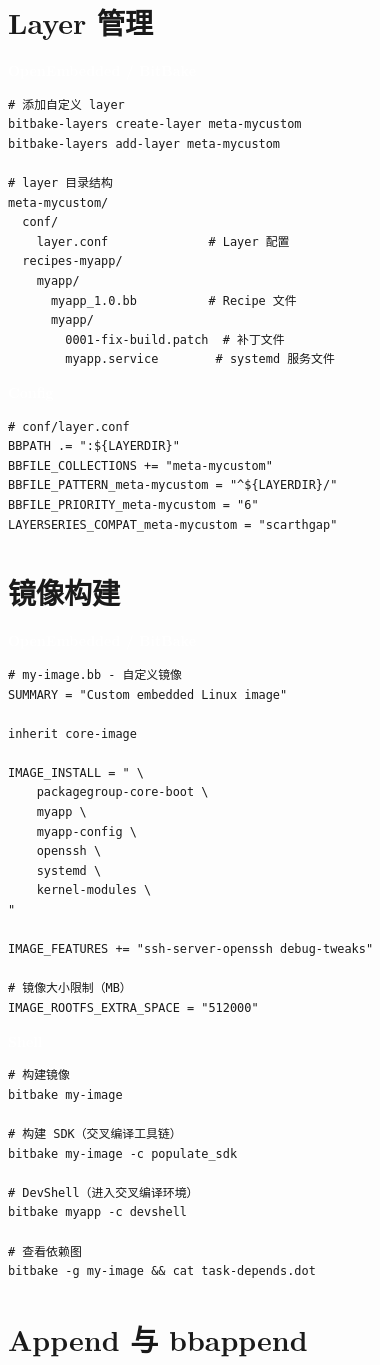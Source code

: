 \documentclass[12pt,a4paper,fontset=fandol]{ctexbook}
\newcommand{\bashlabel}{%
  \noindent\begin{tcolorbox}[sharp corners,colback=cfgheadbg,colframe=cfgheadbg,
    left=6pt,right=6pt,top=2pt,bottom=2pt,boxrule=0pt]
  \textcolor{white}{\small\bfseries\sffamily Shell}\end{tcolorbox}%
}
\newcommand{\oelabel}{%
  \noindent\begin{tcolorbox}[sharp corners,colback=oeheadbg,colframe=oeheadbg,
    left=6pt,right=6pt,top=2pt,bottom=2pt,boxrule=0pt]
  \textcolor{white}{\small\bfseries\sffamily OpenEmbedded / BitBake}\end{tcolorbox}%
}
\newcommand{\cfglabel}{%
  \noindent\begin{tcolorbox}[sharp corners,colback=cfgheadbg,colframe=cfgheadbg,
    left=6pt,right=6pt,top=2pt,bottom=2pt,boxrule=0pt]
  \textcolor{white}{\small\bfseries\sffamily Config}\end{tcolorbox}%
}
\begin{document}
\section{Layer 管理}

\oelabel
\begin{lstlisting}[style=bashstyle]
# 添加自定义 layer
bitbake-layers create-layer meta-mycustom
bitbake-layers add-layer meta-mycustom

# layer 目录结构
meta-mycustom/
  conf/
    layer.conf              # Layer 配置
  recipes-myapp/
    myapp/
      myapp_1.0.bb          # Recipe 文件
      myapp/
        0001-fix-build.patch  # 补丁文件
        myapp.service        # systemd 服务文件
\end{lstlisting}

\cfglabel
\begin{lstlisting}[style=bashstyle]
# conf/layer.conf
BBPATH .= ":${LAYERDIR}"
BBFILE_COLLECTIONS += "meta-mycustom"
BBFILE_PATTERN_meta-mycustom = "^${LAYERDIR}/"
BBFILE_PRIORITY_meta-mycustom = "6"
LAYERSERIES_COMPAT_meta-mycustom = "scarthgap"
\end{lstlisting}

\section{镜像构建}

\oelabel
\begin{lstlisting}[style=bbstyle]
# my-image.bb - 自定义镜像
SUMMARY = "Custom embedded Linux image"

inherit core-image

IMAGE_INSTALL = " \
    packagegroup-core-boot \
    myapp \
    myapp-config \
    openssh \
    systemd \
    kernel-modules \
"

IMAGE_FEATURES += "ssh-server-openssh debug-tweaks"

# 镜像大小限制（MB）
IMAGE_ROOTFS_EXTRA_SPACE = "512000"
\end{lstlisting}

\bashlabel
\begin{lstlisting}[style=bashstyle]
# 构建镜像
bitbake my-image

# 构建 SDK（交叉编译工具链）
bitbake my-image -c populate_sdk

# DevShell（进入交叉编译环境）
bitbake myapp -c devshell

# 查看依赖图
bitbake -g my-image && cat task-depends.dot
\end{lstlisting}

\section{Append 与 bbappend}
\end{document}
